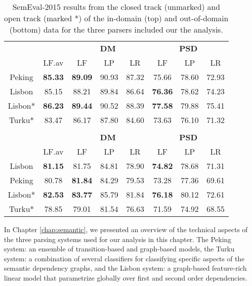 \begin{table}
    \centering
    \begin{tabular}{@{}cccccccc@{}}
        \toprule
        \multicolumn{1}{c}{ }
        & \multicolumn{1}{c}{ }
        & \multicolumn{3}{c}{\textbf{DM}}
        & \multicolumn{3}{c}{\textbf{PSD}} \\
        \cmidrule(lr){3-5}
        \cmidrule(lr){6-8}
        &
        LF.av &
        LF & LP & LR &
        LF & LP & LR \\
        \midrule
        Peking & \textbf{85.33} & \textbf{89.09} & 90.93 & 87.32 &   75.66 & 78.60 & 72.93 \\
        Lisbon & 85.15          & 88.21 & 89.84 & 86.64 &            \textbf{76.36} & 78.62 & 74.23 \\
        \midrule
        Lisbon* & \textbf{86.23}& \textbf{89.44} & 90.52 & 88.39 &   \textbf{77.58} & 79.88 & 75.41 \\
        Turku* & 83.47          & 86.17 & 87.80 & 84.60 &            73.63 & 76.10 & 71.32 \\
        \bottomrule
        
        \\
        \toprule
        \multicolumn{1}{c}{ }
        & \multicolumn{1}{c}{ }
        & \multicolumn{3}{c}{\textbf{DM}}
        & \multicolumn{3}{c}{\textbf{PSD}} \\
        \cmidrule(lr){3-5}
        \cmidrule(lr){6-8}
        &
        LF.av &
        LF & LP & LR &
        LF & LP & LR \\
        \midrule
        Lisbon & \textbf{81.15} &   81.75 & 84.81 & 78.90 &             \textbf{74.82} & 78.68 & 71.31 \\
        Peking & 80.78 &            \textbf{81.84} & 84.29 & 79.53 &    73.28 & 77.36 & 69.61 \\
        \midrule
        Lisbon* & \textbf{82.53} &           \textbf{83.77} & 85.79 & 81.84 &    \textbf{76.18} & 80.12 & 72.61 \\
        Turku* & 78.85 &            79.01 & 81.54 & 76.63 & 71.59 &     74.92 & 68.55 \\
        \bottomrule
    \end{tabular}
    \caption{SemEval-2015 results from the closed track (unmarked) and open track (marked *) of the in-domain (top) and out-of-domain (bottom) data for the three parsers included our the analysis.}
    \label{fig:data:recap}
\end{table}

In Chapter \ref{chap:semantic}, we presented an overview of the technical aspects of the three parsing systems used for our analysis in this chapter. The Peking system: an ensemble of transition-based and graph-based models, the Turku system: a combination of several classifiers for classifying specific aspects of the semantic dependency graphs, and the Lisbon system: a graph-based feature-rich linear model that parametrize globally over first and second order dependencies.

